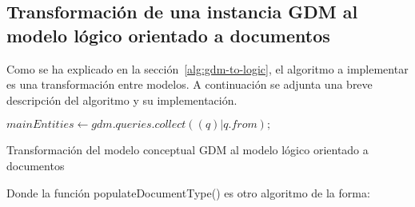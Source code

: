 \subsection{Transformación de una instancia GDM al modelo lógico orientado a documentos}

Como se ha explicado en la sección~\ref{alg:gdm-to-logic}, el algoritmo a implementar es una transformación entre modelos. A continuación se adjunta una breve descripción del algoritmo y su implementación.

\begin{algorithm}[H]

    $mainEntities \gets gdm.queries.collect((q)|q.from);$\\
    
    \caption{Transformación del modelo conceptual GDM al modelo lógico orientado a documentos}
\end{algorithm}

Donde la función populateDocumentType() es otro algoritmo de la forma:


